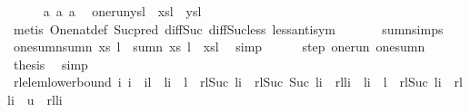 \begin{isabellebody}
\ \ \ \ \isamarkupfalse%
\ a{}\ a{}\ a{}\ \isamarkupfalse%
\ one{\isacharunderscore}run{\isacharcolon}{\isachardoublequoteopen}ys{\isacharbang}{\isacharparenleft}l{\isacharminus}{}{\isacharparenright}\ {\isacharplus}\ xs{\isacharbang}{\isacharparenleft}l{\isacharminus}{}{\isacharparenright}\ {\isacharequal}\ ys{\isacharbang}l{\isachardoublequoteclose}\isanewline
\ \ \ \ \ \ \isamarkupfalse%
\ {\isacharparenleft}metis\ One{\isacharunderscore}nat{\isacharunderscore}def\ Suc{\isacharunderscore}pred{\isacharprime}\ diff{\isacharunderscore}Suc{\isacharunderscore}{}\ diff{\isacharunderscore}Suc{\isacharunderscore}less\ less{\isacharunderscore}antisym{\isacharparenright}\ \isanewline
\ \ \ \ \isamarkupfalse%
\ sumn{\isachardot}simps{\isacharparenleft}{}{\isacharparenright}\ \isamarkupfalse%
\ one{\isacharunderscore}sumn{\isacharcolon}{\isachardoublequoteopen}sumn\ xs\ {\isacharparenleft}l{\isacharplus}{}{\isacharparenright}\ {\isacharequal}\ sumn\ xs\ l\ {\isacharplus}\ xs{\isacharbang}l{\isachardoublequoteclose}\ \isamarkupfalse%
\ simp\isanewline
\ \ \ \ \isamarkupfalse%
\ step{}\ one{\isacharunderscore}run\ one{\isacharunderscore}sumn\ \isamarkupfalse%
\ {\isacharquery}thesis\ \isamarkupfalse%
\ simp\isanewline
\ \ \isamarkupfalse%
\isanewline
{}\isamarkupfalse%
%
\endisatagproof
{\isafoldproof}%
%
\isadelimproof
\isanewline
%
\endisadelimproof
\isanewline
{}\isamarkupfalse%
\ rl{\isacharunderscore}elem{\isacharunderscore}lower{\isacharunderscore}bound{\isacharcolon}\ {\isachardoublequoteopen}{\isasymforall}i{\isachardot}\ {}{\isasymle}i\ {\isasymand}\ i{\isasymle}l\ {\isasymlongrightarrow}\ {\isacharparenleft}l{\isacharminus}i\ {\isacharless}\ l{\isacharminus}{}\ {\isasymlongrightarrow}\ rl{\isacharbang}Suc\ {\isacharparenleft}l{\isacharminus}i{\isacharparenright}\ {\isacharplus}\ rl{\isacharbang}Suc\ {\isacharparenleft}Suc\ {\isacharparenleft}l{\isacharminus}i{\isacharparenright}{\isacharparenright}\ {\isacharless}\ rl{\isacharbang}{\isacharparenleft}l{\isacharminus}i{\isacharparenright}{\isacharparenright}\ {\isasymand}\ {\isacharparenleft}l{\isacharminus}i\ {\isacharless}\ l{\isacharminus}{}\ {\isasymlongrightarrow}\ rl{\isacharbang}Suc\ {\isacharparenleft}l{\isacharminus}i{\isacharparenright}\ {\isacharless}\ rl{\isacharbang}{\isacharparenleft}l{\isacharminus}i{\isacharparenright}{\isacharparenright}\ {\isasymand}\ u\ {\isasymle}\ rl{\isacharbang}{\isacharparenleft}l{\isacharminus}i{\isacharparenright}\ {\isasymLongrightarrow}\isanewline

\end{isabellebody}
